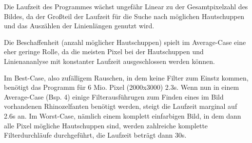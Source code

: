 Die Laufzeit des Programmes wächst ungefähr Linear zu der Gesamtpixelzahl des Bildes, da der Großteil der Laufzeit für die Suche nach möglichen Hautschuppen und das Auszählen der Linienlängen genutzt wird.

Die Beschaffenheit (anzahl möglicher Hautschuppen) spielt im Average-Case eine eher geringe Rolle, da die meisten Pixel bei der Hautschuppen und Linienananlyse mit konstanter Laufzeit ausgeschlossen werden können.

Im Best-Case, also zufälligem Rauschen, in dem keine Filter zum Einstz kommen, benötigt das Programm für 6 Mio. Pixel (2000x3000) 2.3s. 
Wenn nun in einem Average-Case (Bsp. 4) einige Filterausführugen zum Finden eines im Bild vorhandenen Rhinozelfanten benötigt werden, steigt die Laufzeit marginal auf 2.6s an. 
Im Worst-Case, nämlich einem komplett einfarbigen Bild, in dem dann alle Pixel mögliche Hautschuppen sind, werden zahlreiche komplette Filterdurchläufe durchgeführt, die Laufzeit beträgt dann 30s.